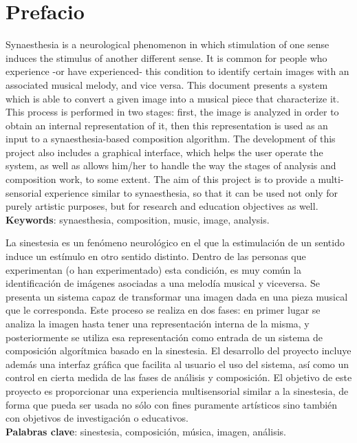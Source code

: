 \chapter*{Prefacio}

\small

Synaesthesia is a neurological phenomenon in which stimulation of one sense induces the stimulus of another different sense. It is common for people who experience -or have experienced- this condition to identify certain images with an associated musical melody, and vice versa. This document presents a system which is able to convert a given image into a musical piece that characterize it. This process is performed in two stages: first, the image is analyzed in order to obtain an internal representation of it, then this representation is used as an input to a synaesthesia-based composition algorithm. The development of this project also includes a graphical interface, which helps the user operate the system, as well as allows him/her to handle the way the stages of analysis and composition work, to some extent. The aim of this project is to provide a multi-sensorial experience similar to synaesthesia, so that it can be used not only for purely artistic purposes, but for research and education objectives as well.\\

\noindent\textbf{Keywords}: synaesthesia, composition, music, image, analysis.\\

\vspace{0.3in}



La sinestesia es un fenómeno neurológico en el que la estimulación de un sentido induce un estímulo en otro sentido distinto. Dentro de las personas que experimentan (o han experimentado) esta condición, es muy común la identificación de imágenes asociadas a una melodía musical y viceversa. Se presenta un sistema capaz de transformar una imagen dada en una pieza musical que le corresponda. Este proceso se realiza en dos fases: en primer lugar se analiza la imagen hasta tener una representación interna de la misma, y posteriormente se utiliza esa representación como entrada de un sistema de composición algorítmica basado en la sinestesia. El desarrollo del proyecto incluye además una interfaz gráfica que facilita al usuario el uso del sistema, así como un control en cierta medida de las fases de análisis y composición. El objetivo de este proyecto es proporcionar una experiencia multisensorial similar a la sinestesia, de forma que pueda ser usada no sólo con fines puramente artísticos sino también con objetivos de investigación o educativos.\\


\noindent\textbf{Palabras clave}: sinestesia, composición, música, imagen, análisis.\\


\normalsize